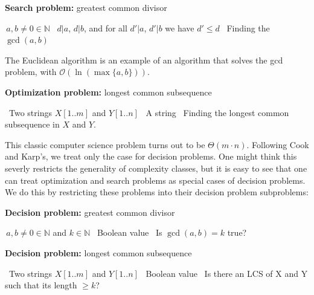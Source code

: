 \documentclass{amsart}
\theoremstyle{plain}
\newcommand{\bigo}{\mathcal{O}}
\begin{document}
\begin{algorithm}[h]
  \caption*{\textbf{Search problem:} greatest common divisor}
  \begin{algorithmic}[1]
    \Require\,$a, b\neq 0\in\mathbb{N}$
    \Ensure\, $d|a$, $d|b$, and for all $d'|a$, $d'|b$ we have $d'\leq d$
    \Description\, Finding the $\gcd(a, b)$
  \end{algorithmic}
\end{algorithm}

The Euclidean algorithm is an example of an algorithm that solves the gcd problem, with
$\bigo(\ln(\max\{a,b\}))$.

\begin{algorithm}[h]
  \caption*{\textbf{Optimization problem:} longest common subsequence}
  \begin{algorithmic}[1]
    \Require\, Two strings $X[1..m]$ and $Y[1..n]$
    \Ensure\, A string
    \Description\, Finding the longest common subsequence in $X$ and $Y$.
  \end{algorithmic}
\end{algorithm}

This classic computer science problem turns out to be $\Theta(m\cdot n)$. Following Cook and
Karp's, we treat only the case for decision problems. One might think this severly restricts the
generality of complexity classes, but it is easy to see that one can treat optimization and search
problems as special cases of decision problems. We do this by restricting these problems into their
decision problem subproblems:

\begin{algorithm}[h]
  \caption*{\textbf{Decision problem:} greatest common divisor}
  \begin{algorithmic}[1]
    \Require\,$a, b\neq 0\in\mathbb{N}$ and $k\in\mathbb{N}$
    \Ensure\, Boolean value
    \Description\, Is $\gcd(a, b)=k$ true?
  \end{algorithmic}
\end{algorithm}

\begin{algorithm}[h]
  \caption*{\textbf{Decision problem:} longest common subsequence}
  \begin{algorithmic}[1]
    \Require\, Two strings $X[1..m]$ and $Y[1..n]$
    \Ensure\, Boolean value
    \Description\, Is there an LCS of X and Y such that its length $\geq k$?
  \end{algorithmic}
\end{algorithm}
\end{document}
